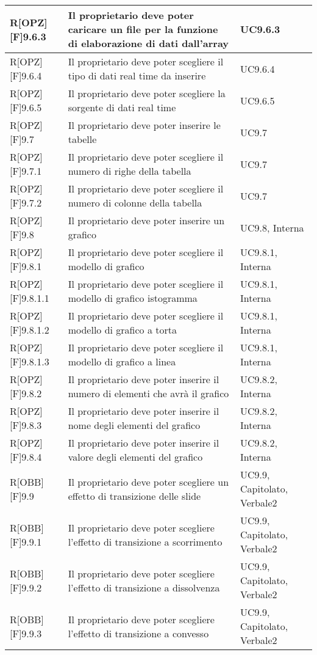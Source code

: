 	\begin{table}[h]
		\begin{tabular}{|p{}|p{}|p{}|}
			\midrule

			R[OPZ][F]9.6.3 & Il proprietario deve poter caricare un file per la funzione di elaborazione di dati dall'array & UC9.6.3 \\ \midrule
			R[OPZ][F]9.6.4 & Il proprietario deve poter scegliere il tipo di dati real time da inserire & UC9.6.4 \\ \midrule
			R[OPZ][F]9.6.5 & Il proprietario deve poter scegliere la sorgente di dati real time & UC9.6.5 \\ \midrule
			R[OPZ][F]9.7 & Il proprietario deve poter inserire le tabelle & UC9.7 \\ \midrule
			R[OPZ][F]9.7.1 & Il proprietario deve poter scegliere il numero di righe della tabella & UC9.7 \\ \midrule
			R[OPZ][F]9.7.2 & Il proprietario deve poter scegliere il numero di colonne della tabella & UC9.7 \\ \midrule
			R[OPZ][F]9.8 & Il proprietario deve poter inserire un grafico & UC9.8, Interna \\ \midrule
			R[OPZ][F]9.8.1 & Il proprietario deve poter scegliere il modello di grafico & UC9.8.1, Interna \\ \midrule
			R[OPZ][F]9.8.1.1 & Il proprietario deve poter scegliere il modello di grafico istogramma & UC9.8.1, Interna \\ \midrule
			R[OPZ][F]9.8.1.2 & Il proprietario deve poter scegliere il modello di grafico a torta & UC9.8.1, Interna \\ \midrule
			R[OPZ][F]9.8.1.3 & Il proprietario deve poter scegliere il modello di grafico a linea & UC9.8.1, Interna \\ \midrule
			R[OPZ][F]9.8.2 & Il proprietario deve poter inserire il numero di elementi che avrà il grafico & UC9.8.2, Interna \\ \midrule
			R[OPZ][F]9.8.3 & Il proprietario deve poter inserire il nome degli elementi del grafico  & UC9.8.2, Interna \\ \midrule
			R[OPZ][F]9.8.4 & Il proprietario deve poter inserire il valore degli elementi del grafico & UC9.8.2, Interna \\ \midrule
			R[OBB][F]9.9 & Il proprietario deve poter scegliere un effetto di transizione delle \gls{slide} & UC9.9, Capitolato, Verbale2 \\ \midrule
			R[OBB][F]9.9.1 & Il proprietario deve poter scegliere l'effetto di transizione a scorrimento & UC9.9, Capitolato, Verbale2 \\ \midrule
			R[OBB][F]9.9.2 & Il proprietario deve poter scegliere l'effetto di transizione a dissolvenza & UC9.9, Capitolato, Verbale2 \\ \midrule
			R[OBB][F]9.9.3 & Il proprietario deve poter scegliere l'effetto di transizione a convesso & UC9.9, Capitolato, Verbale2 \\ \midrule

		\end{tabular}
	\end{table}
	\newpage

